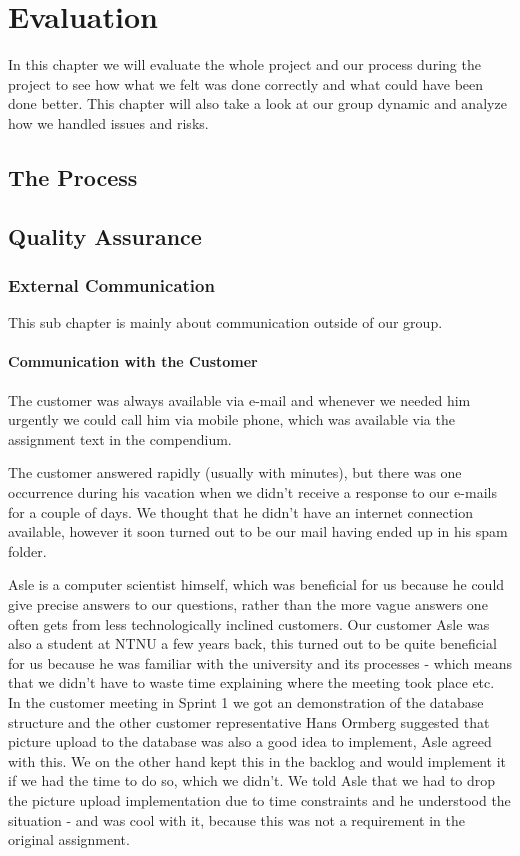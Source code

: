 \chapter{Evaluation}
In this chapter we will evaluate the whole project and our process during the project to see how what we felt was done correctly and what could have been done better. This chapter will also take a look at our group dynamic and analyze how we handled issues and risks.

\newpage
\section{The Process}


\section{Quality Assurance}
\subsection{External Communication}
This sub chapter is mainly about communication outside of our group.
\subsubsection{Communication with the Customer}
The customer was always available via e-mail and whenever we needed him urgently we could call him via mobile phone, which was available via the assignment text in the compendium.

The customer answered rapidly (usually with minutes), but there was one occurrence during his vacation when we didn't receive a response to our e-mails for a couple of days. We thought that he didn't have an internet connection available, however it soon turned out to be our mail having ended up in his spam folder.

Asle is a computer scientist himself, which was beneficial for us because he could give precise answers to our questions, rather than the more vague answers one often gets from less technologically inclined customers. Our customer Asle was also a student at NTNU a few years back, this turned out to be quite beneficial for us because he was familiar with the university and its processes - which means that we didn't have to waste time explaining where the meeting took place etc. \\
In the customer meeting in Sprint 1 we got an demonstration of the database structure and the other customer representative Hans Ormberg suggested that picture upload to the database was also a good idea to implement, Asle agreed with this. We on the other hand kept this in the backlog and would implement it if we had the time to do so, which we didn't. We told Asle that we had to drop the picture upload implementation due to time constraints and he understood the situation - and was cool with it, because this was not a requirement in the original assignment.

